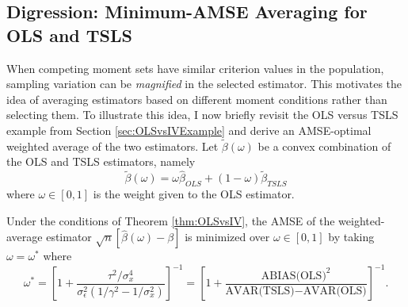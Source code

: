 \subsection{Digression: Minimum-AMSE Averaging for OLS and TSLS}
\label{sec:momentavgexample}
When competing moment sets have similar criterion values in the population, sampling variation can be \emph{magnified} in the selected estimator.
This motivates the idea of averaging estimators based on different moment conditions rather than selecting them.
To illustrate this idea, I now briefly revisit the OLS versus TSLS example from Section \ref{sec:OLSvsIVExample} and derive an AMSE-optimal weighted average of the two estimators.
Let $\widetilde{\beta}(\omega)$ be a convex combination of the OLS and TSLS estimators, namely  
\begin{equation}
	\widetilde{\beta}(\omega) = \omega \widehat{\beta}_{OLS} + (1 - \omega) \widetilde{\beta}_{TSLS}
\end{equation}
where $\omega \in [0,1]$ is the weight given to the OLS estimator.
\begin{thm}
	\label{thm:OLSvsIVavg} 
	Under the conditions of Theorem \ref{thm:OLSvsIV}, the AMSE of the weighted-average estimator $\sqrt{n}\left[\widehat{\beta}(\omega) - \beta \right]$ is minimized over $\omega \in [0,1]$ by taking $\omega = \omega^*$ where
	$$ \omega^* = \left[1 + \frac{\tau^2/\sigma_x^4}{\sigma_\epsilon^2(1/\gamma^2 - 1/\sigma_x^2)}\right]^{-1} = \left[1 + \frac{\mbox{ABIAS(OLS)}^2}{\mbox{AVAR(TSLS)}-\mbox{AVAR(OLS)}} \right]^{-1}.$$
\end{thm}

